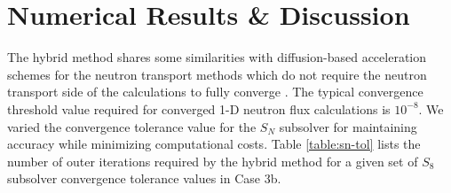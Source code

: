 \documentclass[letterpaper]{mc2025}
\begin{document}
\section{Numerical Results \& Discussion}

The hybrid method shares some similarities with diffusion-based acceleration schemes for the
neutron transport methods which do not require the neutron transport side of the calculations to
fully converge \cite{wang_diffusion_2014}. The typical convergence threshold value required for
converged 1-D neutron flux calculations is $10^{-8}$. We varied the convergence tolerance value for
the $S_N$ subsolver for maintaining accuracy while minimizing computational costs.
Table \ref{table:sn-tol} lists the number of outer iterations required by the hybrid method for
a given set of $S_8$ subsolver convergence tolerance values in Case 3b.
\end{document}
